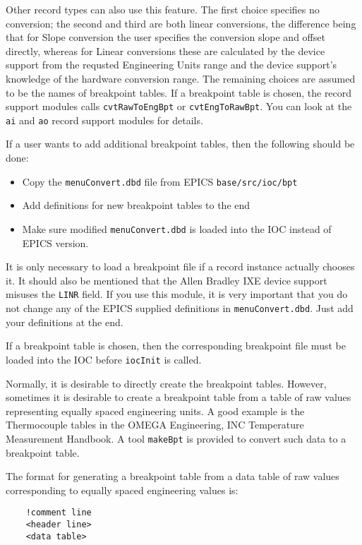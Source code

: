 Other record types can also use this feature. The first choice specifies no conversion; the second and third are both linear 
conversions, the difference being that for Slope conversion the user specifies the conversion slope and offset directly, 
whereas for Linear conversions these are calculated by the device support from the requsted Engineering Units range and 
the device support's knowledge of the hardware conversion range. The remaining choices are assumed to be the names of 
breakpoint tables. If a breakpoint table is chosen, the record support modules calls \verb|cvtRawToEngBpt| or 
\verb|cvtEngToRawBpt|. You can look at the \verb|ai| and \verb|ao| record support modules for details.

If a user wants to add additional breakpoint tables, then the following should be done:

\begin{itemize}
\item Copy the \verb|menuConvert.dbd| file from EPICS \verb|base/src/ioc/bpt|
\item Add definitions for new breakpoint tables to the end
\item Make sure modified \verb|menuConvert.dbd| is loaded  into the IOC instead of EPICS version.
\end{itemize}

It is only necessary to load a breakpoint file if a record instance actually chooses it. It should also be mentioned that the 
Allen Bradley IXE device support misuses the \verb|LINR| field. If you use this module, it is very important that you do not 
change any of the EPICS supplied definitions in \verb|menuConvert.dbd|. Just add your definitions at the end.

If a breakpoint table is chosen, then the corresponding breakpoint file must be loaded into the IOC before \verb|iocInit| is 
called.

Normally, it is desirable to directly create the breakpoint tables. However, sometimes it is desirable to create a breakpoint 
table from a table of raw values representing equally spaced engineering units. A good example is the Thermocouple 
tables in the OMEGA Engineering, INC Temperature Measurement Handbook. A tool \verb|makeBpt| is provided to convert 
such data to a breakpoint table.

The format for generating a breakpoint table from a data table of raw values corresponding to equally spaced engineering 
values is:

\begin{verbatim}
    !comment line
    <header line>
    <data table>
\end{verbatim}

